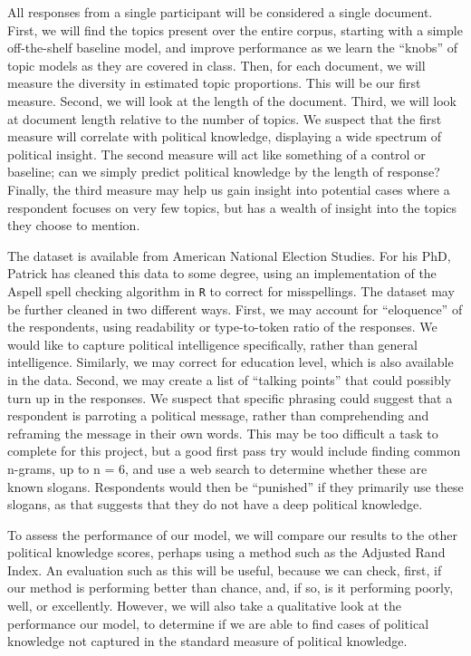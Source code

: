 \documentclass[12pt]{article}
\begin{document}
All responses from a single participant will be considered a single document.  First, we will find the topics present over the entire corpus, starting with a simple off-the-shelf baseline model, and improve performance as we learn the “knobs” of topic models as they are covered in class.  Then, for each document, we will measure the diversity in estimated topic proportions. This will be our first measure. Second, we will look at the length of the document. Third, we will look at document length relative to the number of topics. We suspect that the first measure will correlate with political knowledge, displaying a wide spectrum of political insight. The second measure will act like something of a control or baseline; can we simply predict political knowledge by the length of response? Finally, the third measure may help us gain insight into potential cases where a respondent focuses on very few topics, but has a wealth of insight into the topics they choose to mention.  

The dataset is available from American National Election Studies. For his PhD, Patrick has cleaned this data to some degree, using an implementation of the Aspell spell checking algorithm in \texttt{R} to correct for misspellings. The dataset may be further cleaned in two different ways. First, we may account for “eloquence” of the respondents, using readability or type-to-token ratio of the responses. We would like to capture political intelligence specifically, rather than general intelligence. Similarly, we may correct for education level, which is also available in the data.  Second, we may create a list of ``talking points'' that could possibly turn up in the responses. We suspect that specific phrasing could suggest that a respondent is parroting a political message, rather than comprehending and reframing the message in their own words. This may be too difficult a task to complete for this project, but a good first pass try would include finding common n-grams, up to n = 6, and use a web search to determine whether these are known slogans.  Respondents would then be ``punished'' if they primarily use these slogans, as that suggests that they do not have a deep political knowledge.  

To assess the performance of our model, we will compare our results to the other political knowledge scores, perhaps using a method such as the Adjusted Rand Index. An evaluation such as this will be useful, because we can check, first, if our method is performing better than chance, and, if so, is it performing poorly, well, or excellently. However, we will also take a qualitative look at the performance our model, to determine if we are able to find cases of political knowledge not captured in the standard measure of political knowledge.  
\end{document}
